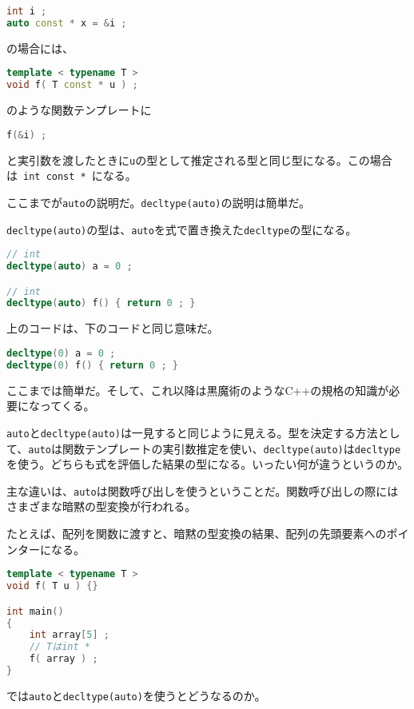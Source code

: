 \begin{lstlisting}[language=C++]
int i ;
auto const * x = &i ;
\end{lstlisting}
の場合には、
\begin{lstlisting}[language=C++]
template < typename T >
void f( T const * u ) ;
\end{lstlisting}
のような関数テンプレートに
\begin{lstlisting}[language=C++]
f(&i) ;
\end{lstlisting}
と実引数を渡したときに\lstinline!u!の型として推定される型と同じ型になる。この場合は~\lstinline!int const *!~になる。

ここまでが\lstinline!auto!の説明だ。\lstinline!decltype(auto)!の説明は簡単だ。

\lstinline!decltype(auto)!の型は、\lstinline!auto!を式で置き換えた\lstinline!decltype!の型になる。

\begin{lstlisting}[language=C++]
// int
decltype(auto) a = 0 ;

// int
decltype(auto) f() { return 0 ; }
\end{lstlisting}

上のコードは、下のコードと同じ意味だ。

\begin{lstlisting}[language=C++]
decltype(0) a = 0 ;
decltype(0) f() { return 0 ; }
\end{lstlisting}

ここまでは簡単だ。そして、これ以降は黒魔術のようなC++の規格の知識が必要になってくる。

\lstinline!auto!と\lstinline!decltype(auto)!は一見すると同じように見える。型を決定する方法として、\lstinline!auto!は関数テンプレートの実引数推定を使い、\lstinline!decltype(auto)!は\lstinline!decltype!を使う。どちらも式を評価した結果の型になる。いったい何が違うというのか。

主な違いは、\lstinline!auto!は関数呼び出しを使うということだ。関数呼び出しの際にはさまざまな暗黙の型変換が行われる。

たとえば、配列を関数に渡すと、暗黙の型変換の結果、配列の先頭要素へのポインターになる。

\begin{lstlisting}[language=C++]
template < typename T >
void f( T u ) {}

int main()
{
    int array[5] ;
    // Tはint *
    f( array ) ;
}
\end{lstlisting}

では\lstinline!auto!と\lstinline!decltype(auto)!を使うとどうなるのか。

